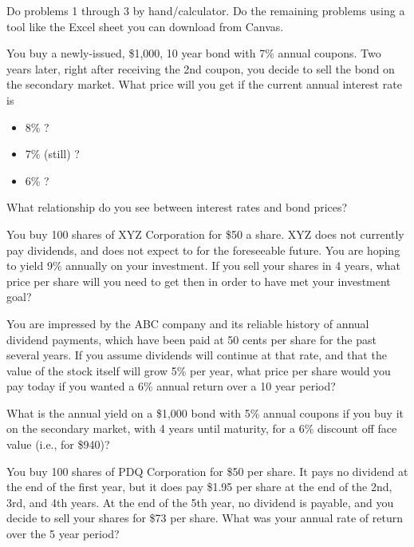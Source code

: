 \documentclass[12pt]{exam}
\begin{document}
\begin{flushleft}
    Do problems 1 through 3 by hand/calculator.  Do the remaining problems using a tool
    like the Excel sheet you can download from Canvas.
\end{flushleft}
\vspace{.5in}

\begin{questions}
    \question You buy a newly-issued, \$1,000, 10 year bond with 7\% annual coupons.  Two years
    later, right after receiving the 2nd coupon, you decide to sell the bond on the secondary market.
    What price will you get if the current annual interest rate is
    \begin{itemize}
        \item 8\% ?
        \item 7\% (still) ?
        \item 6\% ?
    \end{itemize}
    \vspace{1in}
    What relationship do you see between interest rates and bond prices?
    \vspace{.5in}

    \question You buy 100 shares of XYZ Corporation for \$50 a share.  XYZ does  not currently pay
    dividends, and does not expect to for the foreseeable future.  You are hoping to yield 9\%
    annually on your investment.  If you sell your shares in 4 years, what price per share will you
    need to get then in order to have met your investment goal?
    \vspace{1.25in}

    \question You are impressed by the ABC company and its reliable history of annual dividend payments, which
    have been paid at 50 cents per share for the past several years.  If you assume dividends will
    continue at that rate, and that the value of the stock itself will grow 5\% per year, what price
    per share would you pay today if you wanted a 6\% annual return over a 10 year period?
    \vspace{2in}

    \question What is the annual yield on a \$1,000 bond with 5\% annual coupons if you buy it on the secondary
    market, with 4 years until maturity, for a 6\% discount off face value (i.e., for \$940)?
    \vspace{1.5in}

    \question You buy 100 shares of PDQ Corporation for \$50 per share.  It pays no dividend at the end
    of the first year, but it does pay \$1.95 per share at the end of the 2nd, 3rd, and 4th years.  At
    the end of the 5th year, no dividend is payable, and you decide to sell your shares for \$73 per share.
    What was your annual rate of return over the 5 year period?
    \vspace{1.5in}


\end{questions}
\end{document}
